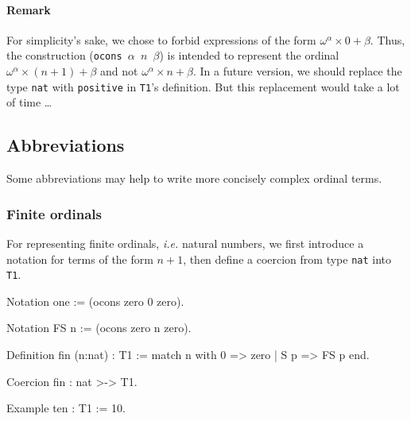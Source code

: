 \paragraph{Remark}
For simplicity's sake, we chose to forbid  expressions of the form $\omega^\alpha\times 0 + \beta$. Thus, the construction (\texttt{ocons $\alpha$ $n$ $\beta$}) is intended to represent the
ordinal $\omega^\alpha\times(n+1)+\beta$ and not $\omega^\alpha\times n+\beta$.
In a future version, we should replace  the type \texttt{nat} with \texttt{positive} in \texttt{T1}'s 
definition. But this replacement would take a lot of time \dots{}

\subsection{Abbreviations}

Some abbreviations may help to write more concisely complex ordinal terms.

\subsubsection{Finite ordinals}
\label{sec:orgheadline67}

For representing finite ordinals, \emph{i.e.} natural numbers, we first introduce a notation for terms of the form $n+1$, then define a coercion from type \texttt{nat} into \texttt{T1}.
\label{sect:notation-FS}

\begin{Coqsrc}
Notation one := (ocons zero 0 zero).
  
Notation FS n := (ocons zero n zero).
\end{Coqsrc}

\label{sect:notation-F}

\begin{Coqsrc}
Definition fin (n:nat) : T1 := 
    match n with 0 => zero | S p => FS p end. 

Coercion fin  : nat >-> T1.

Example ten : T1 := 10.   
\end{Coqsrc}



